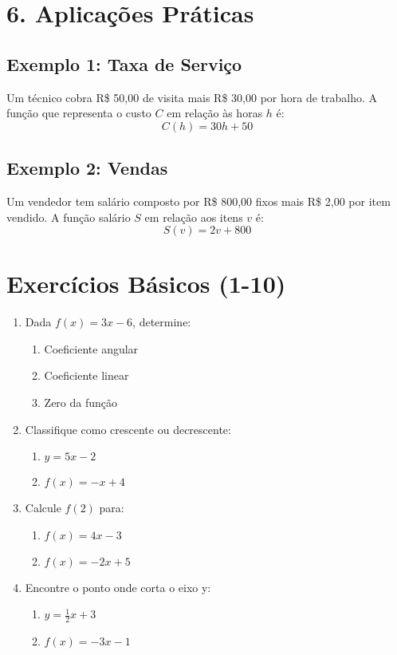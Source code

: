 \documentclass[11pt]{article}
\begin{document}
\begin{multicols}{2}
\section*{6. Aplicações Práticas}
\subsection*{Exemplo 1: Taxa de Serviço}
Um técnico cobra R\$ 50,00 de visita mais R\$ 30,00 por hora de trabalho. A função que representa o custo $C$ em relação às horas $h$ é:
\[
C(h) = 30h + 50
\]

\subsection*{Exemplo 2: Vendas}
Um vendedor tem salário composto por R\$ 800,00 fixos mais R\$ 2,00 por item vendido. A função salário $S$ em relação aos itens $v$ é:
\[
S(v) = 2v + 800
\]

\section*{Exercícios Básicos (1-10)}
\begin{enumerate}
    \item Dada \( f(x) = 3x - 6 \), determine:
    \begin{enumerate}[label=\alph*)]
        \item Coeficiente angular
        \item Coeficiente linear
        \item Zero da função
    \end{enumerate}
    
    \item Classifique como crescente ou decrescente:
    \begin{enumerate}[label=\alph*)]
        \item \( y = 5x - 2 \)
        \item \( f(x) = -x + 4 \)
    \end{enumerate}
    
    \item Calcule \( f(2) \) para:
    \begin{enumerate}[label=\alph*)]
        \item \( f(x) = 4x - 3 \)
        \item \( f(x) = -2x + 5 \)
    \end{enumerate}
    
    \item Encontre o ponto onde corta o eixo y:
    \begin{enumerate}[label=\alph*)]
        \item \( y = \frac{1}{2}x + 3 \)
        \item \( f(x) = -3x - 1 \)
    \end{enumerate}
    

\end{enumerate}
\end{multicols}
\end{document}
